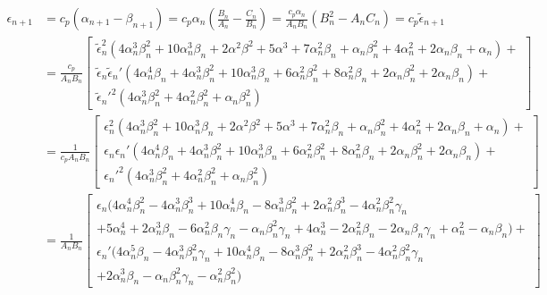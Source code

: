 \begin{align*}
\epsilon_{n+1} &= c_p(\alpha_{n+1} - \beta_{n+1}) = c_p\alpha_n\left( \frac{B_n}{A_n} - \frac{C_n}{B_n} \right) = \frac{c_p\alpha_n}{A_nB_n}\left( B_n^2 - A_nC_n \right)
= c_p\tilde{\epsilon}_{n+1}\\
&= \frac{c_p}{A_nB_n}
\left[ 
\begin{array}{l}
\tilde{\epsilon}_n^2
(4\alpha_n^3\beta_n^2 + 10\alpha_n^3\beta_n + 2\alpha^2\beta^2 + 5\alpha^3
+ 7\alpha_n^2\beta_n + \alpha_n\beta_n^2 + 4\alpha_n^2 + 2\alpha_n\beta_n + \alpha_n)+\\
\tilde{\epsilon}_n\tilde{\epsilon}_n'
(4\alpha_n^4\beta_n + 4\alpha_n^3\beta_n^2 + 10\alpha_n^3\beta_n + 6\alpha_n^2\beta_n^2+
8\alpha_n^2\beta_n + 2\alpha_n\beta_n^2 + 2\alpha_n\beta_n)+\\
\tilde{\epsilon}_n'^2
(4\alpha_n^3\beta_n^2 + 4\alpha_n^2\beta_n^2 + \alpha_n\beta_n^2)
\end{array}\right]\\
&= \frac{1}{c_pA_nB_n}
\left[ 
\begin{array}{l}
\epsilon_n^2
(4\alpha_n^3\beta_n^2 + 10\alpha_n^3\beta_n + 2\alpha^2\beta^2 + 5\alpha^3
+ 7\alpha_n^2\beta_n + \alpha_n\beta_n^2 + 4\alpha_n^2 + 2\alpha_n\beta_n + \alpha_n)+\\
\epsilon_n\epsilon_n'
(4\alpha_n^4\beta_n + 4\alpha_n^3\beta_n^2 + 10\alpha_n^3\beta_n + 6\alpha_n^2\beta_n^2+
8\alpha_n^2\beta_n + 2\alpha_n\beta_n^2 + 2\alpha_n\beta_n)+\\
\epsilon_n'^2
(4\alpha_n^3\beta_n^2 + 4\alpha_n^2\beta_n^2 + \alpha_n\beta_n^2)
\end{array}\right]\\
&= \frac{1}{A_nB_n}
\left[
\begin{array}{l}
\epsilon_n 
( 4\alpha_n^4\beta_n^2 - 4\alpha_n^3\beta_n^3 + 10\alpha_n^4\beta_n - 8\alpha_n^3\beta_n^2 + 2\alpha_n^2\beta_n^3 - 4\alpha_n^2\beta_n^2\gamma_n \\
+ 5\alpha_n^4 + 2\alpha_n^3\beta_n - 6\alpha_n^2\beta_n\gamma_n - \alpha_n\beta_n^2\gamma_n + 4\alpha_n^3 - 2\alpha_n^2\beta_n - 2\alpha_n\beta_n\gamma_n + \alpha_n^2 - \alpha_n\beta_n ) + \\
\epsilon_n'
(4\alpha_n^5\beta_n - 4\alpha_n^3\beta_n^2\gamma_n + 10\alpha_n^4\beta_n - 8\alpha_n^3\beta_n^2 + 2\alpha_n^2\beta_n^3 - 4\alpha_n^2\beta_n^2\gamma_n \\
+ 2\alpha_n^3\beta_n - \alpha_n\beta_n^2\gamma_n - \alpha_n^2\beta_n^2 )
\end{array}\right]
\end{align*}

